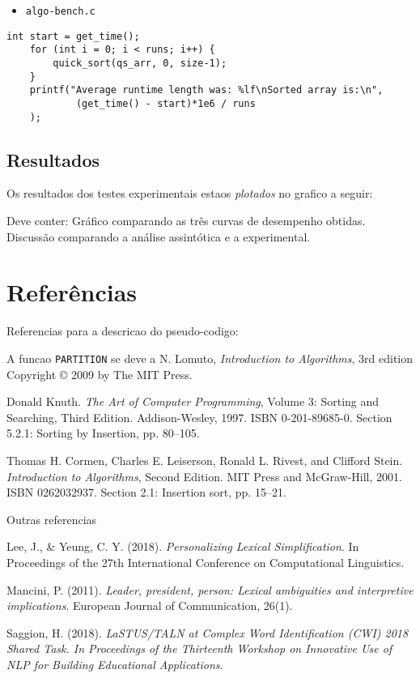 \documentclass{article}
\begin{document}
\begin{itemize}
  \item{\texttt{algo-bench.c}}
\end{itemize}
\begin{verbatim}
int start = get_time();
    for (int i = 0; i < runs; i++) {
        quick_sort(qs_arr, 0, size-1);
    }
    printf("Average runtime length was: %lf\nSorted array is:\n",
            (get_time() - start)*1e6 / runs
    );
\end{verbatim}

\subsection{Resultados}

Os resultados dos testes experimentais estaos \textit{plotados} no grafico a seguir:

Deve conter:
Gráfico comparando as três curvas de desempenho obtidas.
Discussão comparando a análise assintótica e a experimental.


\section{Referências}

Referencias para a descricao do pseudo-codigo:

A funcao \texttt{PARTITION} se deve a N. Lomuto, \textit{Introduction to Algorithms}, 3rd edition Copyright © 2009 by The MIT Press.

Donald Knuth. \textit{The Art of Computer Programming}, Volume 3: Sorting and Searching, Third Edition. Addison-Wesley, 1997. ISBN 0-201-89685-0. Section 5.2.1: Sorting by Insertion, pp. 80–105.

Thomas H. Cormen, Charles E. Leiserson, Ronald L. Rivest, and Clifford Stein. \textit{Introduction to Algorithms}, Second Edition. MIT Press and McGraw-Hill, 2001. ISBN 0262032937. Section 2.1: Insertion sort, pp. 15–21.

Outras referencias

Lee, J., & Yeung, C. Y. (2018). \textit{Personalizing Lexical Simplification}. In Proceedings of the 27th International Conference on Computational Linguistics.

Mancini, P. (2011). \textit{Leader, president, person: Lexical ambiguities and interpretive implications}. European Journal of Communication, 26(1).

Saggion, H. (2018). \textit{LaSTUS/TALN at Complex Word Identification (CWI) 2018 Shared Task. In Proceedings of the Thirteenth Workshop on Innovative Use of NLP for Building Educational Applications}.
\end{document}

